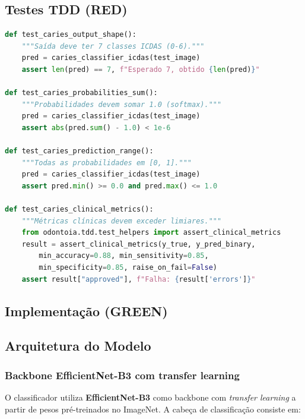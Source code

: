 \subsection{Testes TDD (RED)}

\begin{lstlisting}[language=Python, caption=Projeto 1 — Testes RED para classificador de cáries]
def test_caries_output_shape():
    """Saída deve ter 7 classes ICDAS (0-6)."""
    pred = caries_classifier_icdas(test_image)
    assert len(pred) == 7, f"Esperado 7, obtido {len(pred)}"

def test_caries_probabilities_sum():
    """Probabilidades devem somar 1.0 (softmax)."""
    pred = caries_classifier_icdas(test_image)
    assert abs(pred.sum() - 1.0) < 1e-6

def test_caries_prediction_range():
    """Todas as probabilidades em [0, 1]."""
    pred = caries_classifier_icdas(test_image)
    assert pred.min() >= 0.0 and pred.max() <= 1.0

def test_caries_clinical_metrics():
    """Métricas clínicas devem exceder limiares."""
    from odontoia.tdd.test_helpers import assert_clinical_metrics
    result = assert_clinical_metrics(y_true, y_pred_binary,
        min_accuracy=0.88, min_sensitivity=0.85,
        min_specificity=0.85, raise_on_fail=False)
    assert result["approved"], f"Falha: {result['errors']}"
\end{lstlisting}


\subsection{Implementação (GREEN)}


\subsection{Arquitetura do Modelo}

\subsubsection{Backbone EfficientNet-B3 com transfer learning}

O classificador utiliza \textbf{EfficientNet-B3} como backbone com
\textit{transfer learning} a partir de pesos pré-treinados no ImageNet.
A cabeça de classificação consiste em:

